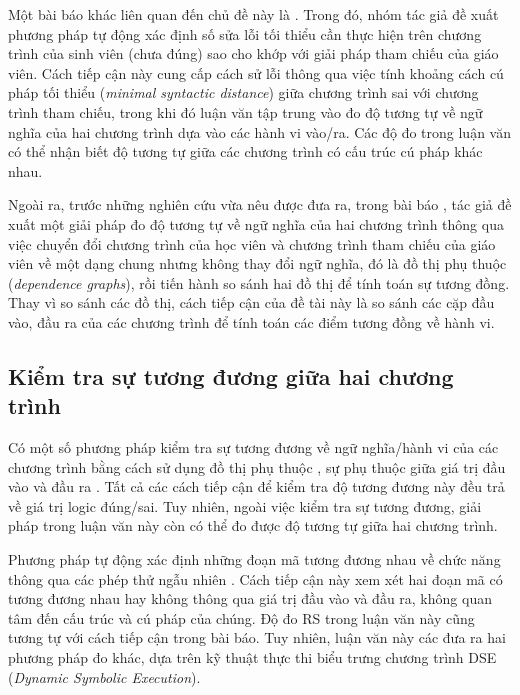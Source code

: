 Một bài báo khác liên quan đến chủ đề này là \cite{singh2013automated}. Trong đó, nhóm tác giả đề xuất phương pháp tự động
xác định số sửa lỗi tối thiểu cần thực hiện trên chương trình của sinh viên (chưa đúng) sao cho khớp với giải pháp tham chiếu của giáo viên. Cách tiếp cận này cung cấp cách sử lỗi thông qua việc tính khoảng cách cú pháp tối thiểu (\emph{minimal syntactic distance}) giữa chương trình sai với chương trình tham chiếu, trong khi đó luận văn tập trung vào đo độ tương tự về ngữ nghĩa của hai chương trình dựa vào các hành vi vào/ra. Các độ đo trong luận văn có thể nhận biết độ tương tự giữa các chương trình có cấu trúc cú pháp khác nhau.

Ngoài ra, trước những nghiên cứu vừa nêu được đưa ra, trong bài báo
\cite{wang2007semantic}, tác giả đề xuất một giải pháp đo độ tương tự
về ngữ nghĩa của hai chương trình thông qua việc chuyển đổi chương
trình của học viên và chương trình tham chiếu của giáo viên về một
dạng chung nhưng không thay đổi ngữ nghĩa, đó là đồ thị phụ thuộc
(\emph{dependence graphs}), rồi tiến hành so sánh hai đồ thị để tính
toán sự tương đồng. Thay vì so sánh các đồ thị, cách tiếp cận của đề
tài này là so sánh các cặp đầu vào, đầu ra của các chương trình để
tính toán các điểm tương đồng về hành vi.
	
\subsection*{Kiểm tra sự tương đương giữa hai chương trình}

Có một số phương pháp kiểm tra sự tương đương về ngữ nghĩa/hành vi của
các chương trình bằng cách sử dụng đồ thị phụ thuộc
\cite{bates1993incremental,binkley1992using}, sự phụ thuộc giữa giá
trị đầu vào và đầu ra \cite{jackson1994semantic}. Tất cả các cách tiếp
cận để kiểm tra độ tương đương này đều trả về giá trị logic
đúng/sai. Tuy nhiên, ngoài việc kiểm tra sự tương đương, giải pháp
trong luận văn này còn có thể đo được độ tương tự giữa hai chương
trình.

Phương pháp tự động xác định những đoạn mã tương đương nhau về chức
năng thông qua các phép thử ngẫu nhiên
\cite{jiang2009automatic}. Cách tiếp cận này xem xét hai đoạn mã có
tương đương nhau hay không thông qua giá trị đầu vào và đầu ra, không
quan tâm đến cấu trúc và cú pháp của chúng. Độ đo RS trong luận văn này cũng tương tự với cách tiếp cận trong bài báo. Tuy nhiên, luận văn này các đưa ra hai phương pháp đo khác, dựa trên kỹ thuật thực thi biểu trưng chương trình DSE (\emph{Dynamic Symbolic Execution}).
	
